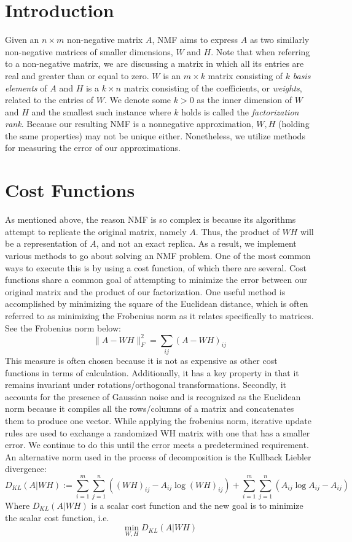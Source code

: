 \documentclass[
10pt, %
a4paper, %
oneside, %
headinclude,footinclude, %
BCOR5mm, %
]{scrartcl}
\begin{document}
\section{Introduction}
Given an $n\times m$ non-negative matrix $A$, NMF aims to express $A$ as two similarly non-negative matrices of smaller dimensions, $W$ and $H$. Note that when referring to a non-negative matrix, we are discussing a matrix in which all its entries are real and greater than or equal to zero. $W$ is an $m\times k$ matrix consisting of $k$ \textit{basis elements} of $A$ and $H$ is a $k\times n$ matrix consisting of the coefficients, or \textit{weights}, related to the entries of $W$. We denote some $k>0$ as the inner dimension of $W$ and $H$ and the smallest such instance where $k$ holds is called the \emph{factorization rank}\cite{algorithms}. Because our resulting NMF is a nonnegative approximation, $W,H$ (holding the same properties) may not be unique either. Nonetheless, we utilize methods for measuring the error of our approximations.

\section{Cost Functions}
As mentioned above, the reason NMF is so complex is because its algorithms attempt to replicate the original matrix, namely $A$. Thus, the product of $WH$ will be a representation of $A$, and not an exact replica. As a result, we implement various methods to go about solving an NMF problem. One of the most common ways to execute this is by using a cost function, of which there are several. Cost functions share a common goal of attempting to minimize the error between our original matrix and the product of our factorization.
One useful method is accomplished by minimizing the square of the Euclidean distance,  which is often referred to as minimizing the Frobenius norm as it relates specifically to matrices. See the Frobenius norm below\cite{algorithms}:
$$\lVert A-WH\rVert^{2}_{F}=\sum_{ij}(A-WH)_{ij}$$
This measure is often chosen because it is not as expensive as other cost functions in terms of calculation. Additionally, it has a key property in that it remains invariant under rotations/orthogonal transformations. Secondly, it accounts for the presence of Gaussian noise and is recognized as the Euclidean norm because it compiles all the rows/columns of a matrix and concatenates them to produce one vector.  While applying the frobenius norm, iterative update rules are used to exchange a randomized WH matrix with one that has a smaller error. We continue to do this until the error meets a predetermined requirement.
An alternative norm used in the process of decomposition is the Kullback Liebler divergence\cite{inproceedings}:
$$D_{KL}(A\vert WH):=\sum_{i=1}^{m}\sum_{j=1}^{n}((WH)_{ij}-A_{ij}\log(WH)_{ij})+\sum_{i=1}^{m}\sum_{j=1}^{n}(A_{ij}\log A_{ij}-A_{ij})$$
Where $D_{KL}(A|WH)$ is a scalar cost function and the new goal is to minimize the scalar cost function, i.e.
$$\min_{W,H}D_{KL}(A|WH)$$
\end{document}
